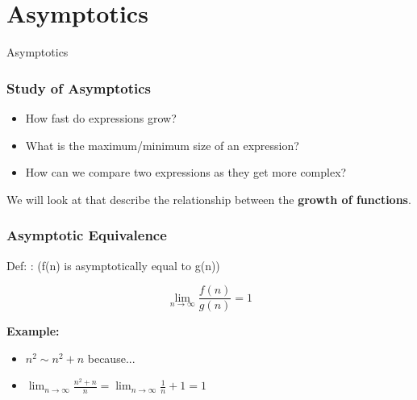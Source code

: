 \documentclass{beamer}
\begin{document}

\section{Asymptotics}

\begin{frame}
  \begin{center}
    {\huge
      Asymptotics
    }
  \end{center}
\end{frame}

\begin{frame}
  \frametitle{Study of Asymptotics}

  {\larger
    \begin{itemize}
    \item How fast do expressions grow?
      \bigskip
      
    \item What is the maximum/minimum size of an expression?
      \bigskip
      
    \item How can we compare two expressions as they get more complex?
    \end{itemize}

    \bigskip

    We will look at  that describe the
    relationship between the {\bf growth of functions}.

  }
\end{frame}

\begin{frame}
  \frametitle{Asymptotic Equivalence}

  {\larger

    Def: : \hfill(f(n) is asymptotically equal to g(n))

    \bigskip

    \begin{equation}
      \lim_{n\to\infty}\frac{f(n)}{g(n)} = 1
    \end{equation}

    {\bf Example:}
    \begin{itemize}
    \item $n^2 \sim n^2+n$ because...
    \item $\lim_{n\to\infty}\frac{n^2+n}{n} = \lim_{n\to\infty} \frac{1}{n} + 1 = 1$
    \end{itemize}
    
  }
\end{frame}
\end{document}
